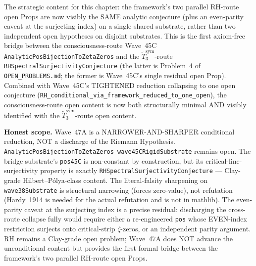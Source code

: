 \begin{remark}
\begin{itemize}
\end{itemize}
The strategic content for this chapter: the framework's two parallel RH-route open Props are now visibly the SAME analytic conjecture (plus an even-parity caveat at the surjecting index) on a single shared substrate, rather than two independent open hypotheses on disjoint substrates. This is the first axiom-free bridge between the consciousness-route Wave~45C \texttt{AnalyticPosBijectionToZetaZeros} and the $\widetilde{T}_3^{\mathrm{sym}}$-route \texttt{RHSpectralSurjectivityConjecture} (the latter is Problem~4 of \texttt{OPEN\_PROBLEMS.md}; the former is Wave~45C's single residual open Prop). Combined with Wave~45C's TIGHTENED reduction collapsing to one open conjecture (\texttt{RH\_conditional\_via\_framework\_reduced\_to\_one\_open}), the consciousness-route open content is now both structurally minimal AND visibly identified with the $\widetilde{T}_3^{\mathrm{sym}}$-route open content.

\textbf{Honest scope.} Wave~47A is a NARROWER-AND-SHARPER conditional reduction, NOT a discharge of the Riemann Hypothesis. \texttt{AnalyticPosBijectionToZetaZeros wave45CRigidSubstrate} remains open. The bridge substrate's \texttt{pos45C} is non-constant by construction, but its critical-line-surjectivity property is exactly \texttt{RHSpectralSurjectivityConjecture} --- Clay-grade Hilbert--P\'olya-class content. The literal-falsity sharpening on \texttt{wave38Substrate} is structural narrowing (forces zero-value), not refutation (Hardy~1914 is needed for the actual refutation and is not in mathlib). The even-parity caveat at the surjecting index is a precise residual: discharging the cross-route collapse fully would require either a re-engineered \texttt{pos} whose EVEN-index restriction surjects onto critical-strip $\zeta$-zeros, or an independent parity argument. RH remains a Clay-grade open problem; Wave~47A does NOT advance the unconditional content but provides the first formal bridge between the framework's two parallel RH-route open Props.
\end{remark}

